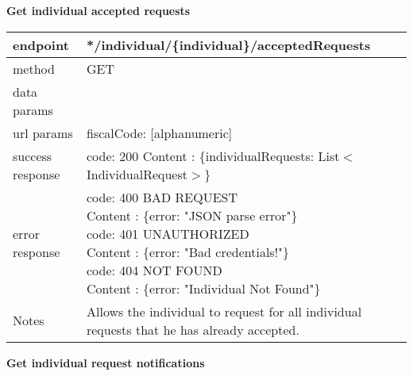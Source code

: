 	\textbf{Get individual accepted requests} \\

	\begin{tabularx}{\linewidth}{| l| l }
		\hline
		endpoint & */individual/\{individual\}/acceptedRequests \\
		\hline
		method & GET \\
		\hline
		data params & \\
		\hline
		url params &
		\parbox{0.7\textwidth}{
			\bigskip
			fiscalCode: [alphanumeric]
			\bigskip
		} \\
		\hline
		success response &
		\parbox{0.7\textwidth}{
			\bigskip
			code: 200\\
			Content : \{individualRequests: List$<$IndividualRequest$>$\}
			\bigskip
		} \\
		\hline
		error response &
		\parbox{0.7\textwidth}{
			\bigskip
			code: 400 BAD REQUEST \\
			Content : \{error: "JSON parse error"\}\\
			code: 401 UNAUTHORIZED \\
			Content : \{error: "Bad credentials!"\}\\
			code: 404 NOT FOUND \\
			Content : \{error: "Individual Not Found"\}
			\bigskip
		} \\
		\hline
		Notes & 
		\parbox{0.7\textwidth}{
			\bigskip Allows the individual to request for all individual requests that he has already accepted.
		\bigskip}  \\
		\hline
	\end{tabularx}
	
	\textbf{Get individual request notifications} \\

